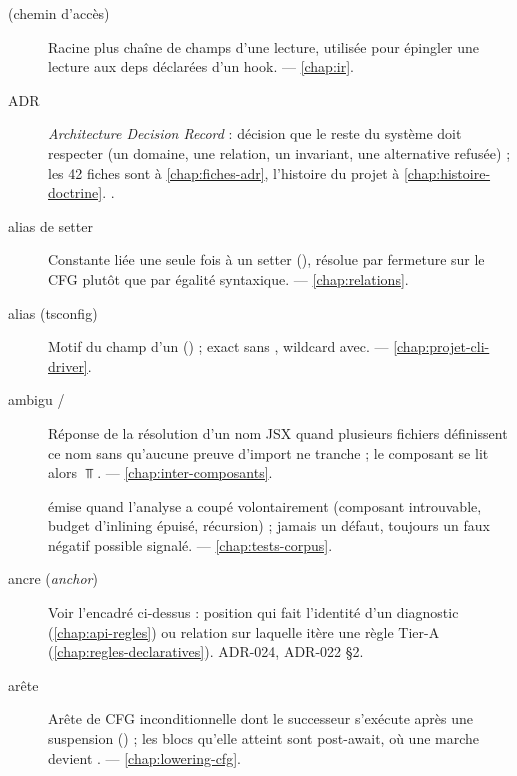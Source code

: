 \begin{description}

\item[ (chemin d'accès)] Racine plus chaîne de champs d'une lecture, utilisée pour épingler une lecture aux deps déclarées d'un hook.  — \cref{chap:ir}.

\item[ADR] \emph{Architecture Decision Record} : décision que le reste du système doit respecter (un domaine, une relation, un invariant, une alternative refusée) ; les 42 fiches sont à \cref{chap:fiches-adr}, l'histoire du projet à \cref{chap:histoire-doctrine}. .

\item[alias de setter] Constante liée une seule fois à un setter (), résolue par fermeture sur le CFG plutôt que par égalité syntaxique.  — \cref{chap:relations}.

\item[alias (tsconfig)] Motif du champ  d'un  () ; \og exact\fg{} sans \code{*}, \og wildcard\fg{} avec.  — \cref{chap:projet-cli-driver}.

\item[ambigu / ] Réponse de la résolution d'un nom JSX quand plusieurs fichiers définissent ce nom sans qu'aucune preuve d'import ne tranche ; le composant se lit alors \(\Top\).  — \cref{chap:inter-composants}.

\item[] \Info{} émise quand l'analyse a coupé volontairement (composant introuvable, budget d'inlining épuisé, récursion) ; jamais un défaut, toujours un faux négatif possible signalé.  — \cref{chap:tests-corpus}.

\item[ancre (\emph{anchor})] Voir l'encadré ci-dessus : position qui fait l'identité d'un diagnostic (\cref{chap:api-regles}) ou relation sur laquelle itère une règle Tier-A (\cref{chap:regles-declaratives}). ADR-024, ADR-022 §2.

\item[arête ] Arête de CFG inconditionnelle dont le successeur s'exécute après une suspension () ; les blocs qu'elle atteint sont \og post-await\fg{}, où une marche  devient .  — \cref{chap:lowering-cfg}.


\end{description}
